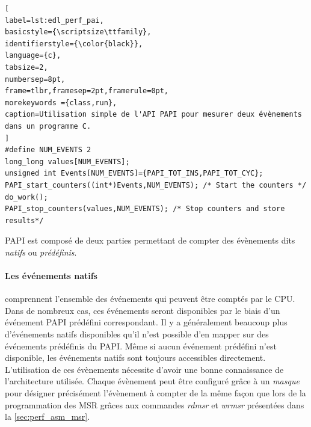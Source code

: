 \begin{lstlisting}[
label=lst:edl_perf_pai,
basicstyle={\scriptsize\ttfamily},
identifierstyle={\color{black}},
language={c},
tabsize=2,
numbersep=8pt,
frame=tlbr,framesep=2pt,framerule=0pt,
morekeywords ={class,run},
caption=Utilisation simple de l'API PAPI pour mesurer deux évènements dans un programme C.
]
#define NUM_EVENTS 2  
long_long values[NUM_EVENTS];
unsigned int Events[NUM_EVENTS]={PAPI_TOT_INS,PAPI_TOT_CYC};
PAPI_start_counters((int*)Events,NUM_EVENTS); /* Start the counters */
do_work();
PAPI_stop_counters(values,NUM_EVENTS); /* Stop counters and store results*/
\end{lstlisting}

        
            PAPI est composé de deux parties permettant de compter des évènements dits \textit{natifs} ou \textit{prédéfinis}. 
            
            \paragraph{Les événements \textbf{natifs}} comprennent l'ensemble des événements qui peuvent être comptés par le CPU. Dans de nombreux cas, ces événements seront disponibles par le biais d'un événement PAPI prédéfini correspondant. Il y a généralement beaucoup plus d'événements natifs disponibles qu'il n'est possible d'en mapper sur des événements prédéfinis du PAPI. Même si aucun événement prédéfini n'est disponible, les événements natifs sont toujours accessibles directement. L'utilisation de ces évènements nécessite d'avoir une bonne connaissance de l'architecture utilisée. Chaque évènement peut être configuré grâce à un \textit{masque} pour désigner précisément l'évènement à compter de la même façon que lors de la programmation des MSR grâces aux commandes \textit{rdmsr} et \textit{wrmsr} présentées dans la \autoref{sec:perf_asm_msr}. 
            
